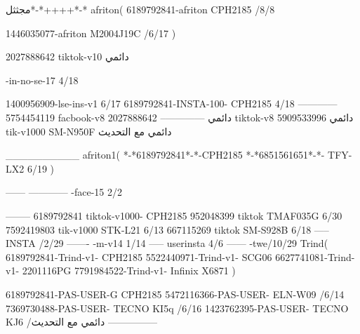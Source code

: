 مجثثل*-*++++*-*
afriton(
6189792841-afriton CPH2185  /8/8

1446035077-afriton M2004J19C  /6/17
)

2027888642 tiktok-v10
دائمي

-in-no-se-17 4/18

1400956909-lse-ins-v1 6/17
6189792841-INSTA-100- CPH2185 4/18
------------
5754454119 facbook-v8
دائمي
--------------
2027888642 tiktok-v8
دائمي
5909533996 tik-v1000  SM-N950F
دائمي مع التحديث

__________
afriton1(
*-*6189792841*-*-CPH2185
*-*6851561651*-*- TFY-LX2  6/19
)


------
------------
-face-15 2/2

--------
6189792841 tiktok-v1000- CPH2185 
952048399 tiktok TMAF035G  6/30
7592419803 tik-v1000 STK-L21  6/13
667115269 tiktok SM-S928B  6/18
-----
 INSTA /2/29
-------
-m-v14 1/14
-----
userinsta 4/6
------
-twe/10/29
Trind(
6189792841-Trind-v1- CPH2185 
5522440971-Trind-v1- SCG06 \6
6627741081-Trind-v1- 2201116PG \6
7791984522-Trind-v1- Infinix X6871 \6
)


6189792841-PAS-USER-G CPH2185 
5472116366-PAS-USER- ELN-W09  /6/14
7369730488-PAS-USER- TECNO KI5q  /6/16
1423762395-PAS-USER- TECNO KJ6  /دائمي مع التحديث
    ---------------
